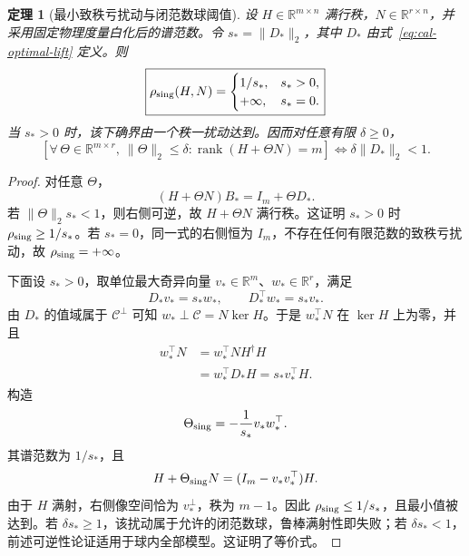 \documentclass[11pt,a4paper]{article}
\numberwithin{equation}{section}
\newtheorem{theorem}{定理}[section]
\theoremstyle{definition}
\begin{document}
\begin{theorem}[最小致秩亏扰动与闭范数球阈值]
\label{rev:thm:robust-surjectivity}
设 $H\in\mathbb R^{m\times n}$ 满行秩，$N\in\mathbb R^{r\times n}$，并采用固定物理度量白化后的谱范数。令 $s_*=\|D_*\|_2$，其中 $D_*$ 由式~\eqref{eq:cal-optimal-lift} 定义。则
\begin{equation}
 \boxed{
 \rho_{\rm sing}(H,N)=
 \begin{cases}
  1/s_*,&s_*>0,\\
  +\infty,&s_*=0.
 \end{cases}}
 \label{rev:eq:exact-sing-radius}
\end{equation}
当 $s_*>0$ 时，该下确界由一个秩一扰动达到。因而对任意有限 $\delta\ge0$，
\begin{equation}
 \boxed{
 \left[
 \forall\,\Theta\in\mathbb R^{m\times r},\
 \|\Theta\|_2\le\delta:
 \operatorname{rank}(H+\Theta N)=m
 \right]
 \iff
 \delta\|D_*\|_2<1.}
 \label{rev:eq:robust-rank-iff}
\end{equation}
\end{theorem}

\begin{proof}
对任意 $\Theta$，
\begin{equation}
 (H+\Theta N)B_*=I_m+\Theta D_* .
 \label{rev:eq:robust-right-product}
\end{equation}
若 $\|\Theta\|_2s_*<1$，则右侧可逆，故 $H+\Theta N$ 满行秩。这证明 $s_*>0$ 时 $\rho_{\rm sing}\ge1/s_*$。若 $s_*=0$，同一式的右侧恒为 $I_m$，不存在任何有限范数的致秩亏扰动，故 $\rho_{\rm sing}=+\infty$。

下面设 $s_*>0$，取单位最大奇异向量 $v_*\in\mathbb R^m$、$w_*\in\mathbb R^r$，满足
\begin{equation}
 D_*v_*=s_*w_*,
 \qquad
 D_*^\top w_*=s_*v_* .
 \label{rev:eq:worst-singular-pair}
\end{equation}
由 $D_*$ 的值域属于 $\mathcal C^\perp$ 可知 $w_*\perp\mathcal C=N\ker H$。于是 $w_*^\top N$ 在 $\ker H$ 上为零，并且
\begin{align}
 w_*^\top N
 &=w_*^\top NH^\dagger H\\
 &=w_*^\top D_*H
 =s_*v_*^\top H .
 \label{rev:eq:rank-loss-factor}
\end{align}
构造
\begin{equation}
 \Theta_{\rm sing}
 =-\frac1{s_*}v_*w_*^\top .
 \label{rev:eq:singular-witness}
\end{equation}
其谱范数为 $1/s_*$，且
\begin{equation}
 H+\Theta_{\rm sing}N
 =(I_m-v_*v_*^\top)H .
 \label{rev:eq:rank-deficient-response}
\end{equation}
由于 $H$ 满射，右侧像空间恰为 $v_*^\perp$，秩为 $m-1$。因此 $\rho_{\rm sing}\le1/s_*$，且最小值被达到。若 $\delta s_*\ge1$，该扰动属于允许的闭范数球，鲁棒满射性即失败；若 $\delta s_*<1$，前述可逆性论证适用于球内全部模型。这证明了等价式。
\end{proof}
\end{document}
